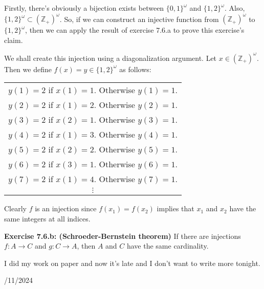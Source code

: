 \documentclass{book}
\newcommand{\myComment}{%
   \color{RawerSienna}%
   \fontsize{12}{14}\selectfont%
}
\newcommand{\exTwo}{%
\color{Purple}%
   \fontsize{13}{15}\selectfont%
}
\newenvironment{myIndent}{%
   \begin{adjustwidth}{2.5em}{0em}%
}{%
   \end{adjustwidth}%
}
\newcommand{\blab}[1]{\textbf{#1}}
\newcommand{\retTwo}{\hfill\bigbreak}
\newcommand{\dispDate}[1]{{
   \color{Black}%
   \fontsize{20}{18}\selectfont%
   #1\retTwo
}}
\begin{document}
   
   \begin{myIndent}\exTwo
      Firstly, there's obviously a bijection exists between $\{0, 1\}^\omega$ and $\{1, 2\}^\omega$. Also,\\ $\{1, 2\}^\omega \subset (\mathbb{Z}_+)^\omega$. So, if we can construct an injective function from $(\mathbb{Z}_+)^\omega$ to\\ $\{1, 2\}^\omega$, then we can apply the result of exercise 7.6.a to prove this exercise's\\ claim.\retTwo

      We shall create this injection using a diagonalization argument. Let $x \in (\mathbb{Z}_+)^\omega$.\\ Then we define $f(x) = y \in \{1, 2\}^\omega$ as follows:
      
      \begin{center}
         \begin{tabular}{c}
            $y(1) = 2$ if $x(1) = 1$. Otherwise $y(1) = 1$.\\ [6pt]
            $y(2) = 2$ if $x(1) = 2$. Otherwise $y(2) = 1$.\\
            $y(3) = 2$ if $x(2) = 1$. Otherwise $y(3) = 1$.\\ [6pt]
            $y(4) = 2$ if $x(1) = 3$. Otherwise $y(4) = 1$.\\
            $y(5) = 2$ if $x(2) = 2$. Otherwise $y(5) = 1$.\\
            $y(6) = 2$ if $x(3) = 1$. Otherwise $y(6) = 1$. \\ [6pt]

            $y(7) = 2$ if $x(1) = 4$. Otherwise $y(7) = 1$.\\
            $\vdots$\\ [12pt]
         \end{tabular}
      \end{center}

      Clearly $f$ is an injection since $f(x_1) = f(x_2)$ implies that $x_1$ and $x_2$ have the same integers at all indices.\retTwo\retTwo
   \end{myIndent}

   \blab{Exercise 7.6.b: (Schroeder-Bernstein theorem)} If there are injections $f: A \longrightarrow C$ and $g: C\longrightarrow A$, then $A$ and $C$ have the same cardinality.\retTwo
   \myComment
   I did my work on paper and now it's late and I don't want to write more tonight.\retTwo\retTwo

   \dispDate{9/11/2024}
\end{document}
